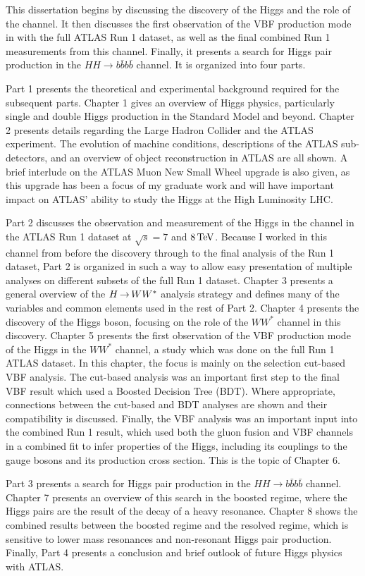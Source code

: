 This dissertation begins by discussing the discovery of the Higgs and the role of the \HWWfull channel. It then discusses the first observation of the VBF production mode in \HWWfull with the full ATLAS Run 1 dataset, as well as the final combined Run 1 measurements from this channel. Finally, it presents a search for Higgs pair production in the $HH\to b\bar{b}b\bar{b}$ channel. It is organized into four parts. 

Part 1 presents the theoretical and experimental background required for the subsequent parts. Chapter 1 gives an overview of Higgs physics, particularly single and double Higgs production in the Standard Model and beyond. Chapter 2 presents details regarding the Large Hadron Collider and the ATLAS experiment. The evolution of machine conditions, descriptions of the ATLAS sub-detectors, and an overview of object reconstruction in ATLAS are all shown. A brief interlude on the ATLAS Muon New Small Wheel upgrade is also given, as this upgrade has been a focus of my graduate work and will have important impact on ATLAS' ability to study the Higgs at the High Luminosity LHC. 

Part 2 discusses the observation and measurement of the Higgs in the \HWWfull channel in the ATLAS Run 1 dataset at $\sqrt{s} = 7$ and $8 \TeV$. Because I worked in this channel from before the discovery through to the final analysis of the Run 1 dataset, Part 2 is organized in such a way to allow easy presentation of multiple analyses on different subsets of the full Run 1 dataset. Chapter 3 presents a general overview of the $H{\,{\rightarrow}\,}WW^\ast$ analysis strategy and defines many of the variables and common elements used in the rest of Part 2. Chapter 4 presents the discovery of the Higgs boson, focusing on the role of the $WW^*$ channel in this discovery. Chapter 5 presents the first observation of the VBF production mode of the Higgs in the $WW^*$ channel, a study which was done on the full Run 1 ATLAS dataset. In this chapter, the focus is mainly on the selection cut-based VBF analysis. The cut-based analysis was an important first step to the final VBF result which used a Boosted Decision Tree (BDT). Where appropriate, connections between the cut-based and BDT analyses are shown and their compatibility is discussed. Finally, the VBF analysis was an important input into the combined Run 1 \HWWfull result, which used both the gluon fusion and VBF channels in a combined fit to infer properties of the Higgs, including its couplings to the gauge bosons and its production cross section. This is the topic of Chapter 6. 

Part 3 presents a search for Higgs pair production in the $HH \to b\bar{b} b\bar{b}$ channel. Chapter 7 presents an overview of this search in the boosted regime, where the Higgs pairs are the result of the decay of a heavy resonance. Chapter 8 shows the combined results between the boosted regime and the resolved regime, which is sensitive to lower mass resonances and non-resonant Higgs pair production. Finally, Part 4 presents a conclusion and brief outlook of future Higgs physics with ATLAS.